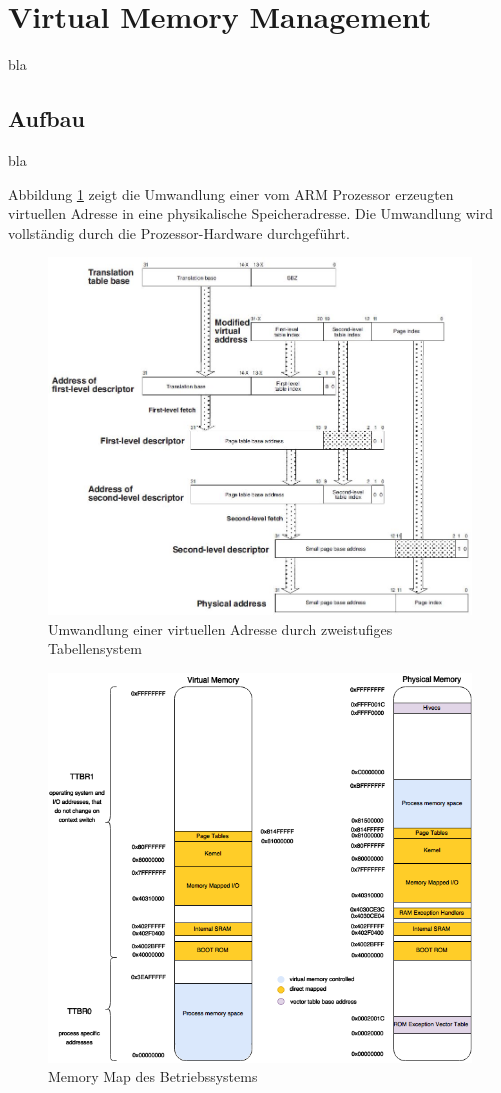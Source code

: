 \section{Virtual Memory Management}
bla

\subsection{Aufbau}
bla

Abbildung \ref{fig:largePageTranslation} zeigt die Umwandlung einer vom ARM Prozessor erzeugten virtuellen Adresse in eine physikalische Speicheradresse. Die Umwandlung wird vollständig durch die Prozessor-Hardware durchgeführt.

\begin{figure}
	\includegraphics[scale=0.8]{figures/largePageTranslation}
	\caption{Umwandlung einer virtuellen Adresse durch zweistufiges Tabellensystem}
	\label{fig:largePageTranslation}
\end{figure}


\begin{figure}
	\includegraphics[scale=0.7]{figures/MemoryMap}
	\caption{Memory Map des Betriebssystems}
	\label{fig:MemoryMap}
\end{figure}

\pagebreak 